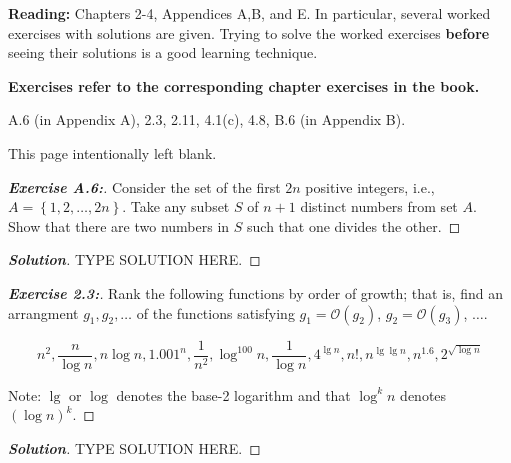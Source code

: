 \documentclass[a4paper]{article}
\newenvironment{solution}{\begin{proof}[\textnormal{\textbf{Solution}}]}{\end{proof}}
\newenvironment{exercise}[1]{\begin{proof}[\textnormal{\textbf{Exercise #1:}}]\renewcommand{\qedsymbol}{}}{\end{proof}}
\newcommand{\bigO}[1]{\mathcal{O}\left(#1\right)}
\newcommand{\set}[1]{\left\lbrace#1\right\rbrace}
\begin{document}
\begin{titlepage}
    \medskip

    \textbf{Reading:} Chapters  2-4, Appendices A,B, and E. In particular, several worked exercises with solutions are given. Trying to solve the worked exercises \textbf{before} seeing their solutions is a good learning technique.
    \medskip

    \textbf{Exercises refer to the corresponding chapter exercises in the book.}

    A.6 (in Appendix A), 2.3, 2.11, 4.1(c), 4.8, B.6 (in Appendix B).
    \vfill



\end{titlepage}
\vspace*{\fill}\begin{center}{\Huge This page intentionally left blank.}\end{center}\vspace*{\fill}\thispagestyle{empty}\clearpage
{}

\begin{exercise}{A.6}
    Consider the set of the first \(2n\) positive integers, i.e., \(A = \set{1, 2, \hdots, 2n}\). Take any subset \(S\) of \(n + 1\) distinct numbers from set \(A\). Show that there are two numbers in \(S\) such that one divides the other.
\end{exercise}

\begin{solution}
    TYPE SOLUTION HERE.
\end{solution}

\begin{exercise}{2.3}
    Rank the following functions by order of growth; that is, find an arrangment \(g_1, g_2, \hdots\) of the functions satisfying \(g_1 = \bigO{g_2}\), \(g_2 = \bigO{g_3}\), \(\hdots\).

    \[n^2, \frac{n}{\log{n}}, n\log{n}, 1.001^n, \frac{1}{n^2}, \log^{100}{n}, \frac{1}{\log{n}}, 4^{\lg{n}}, n!, n^{\lg{\lg{n}}}, n^{1.6}, 2^{\sqrt{\log{n}}}\]

    Note: \(\lg\) or \(\log\) denotes the base-2 logarithm and that \(\log^k{n}\) denotes \((\log{n})^k\).
\end{exercise}

\begin{solution}
    TYPE SOLUTION HERE.
\end{solution}
\end{document}
